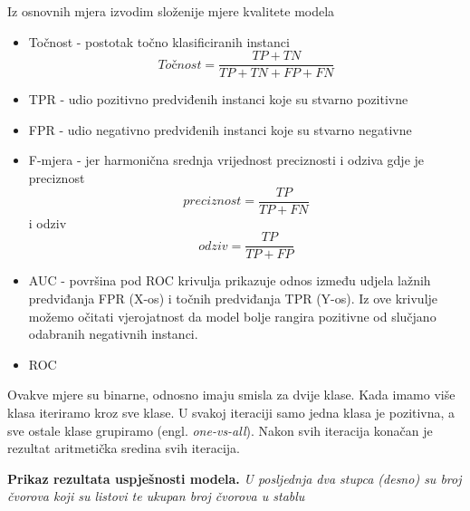 Iz osnovnih mjera izvodim složenije mjere kvalitete modela
\begin{itemize}
   \item Točnost - postotak točno klasificiranih instanci 
   \begin{equation}
   Točnost = \frac{TP+TN}{TP+TN+FP+FN}
   \end{equation}
   \item TPR - udio pozitivno predviđenih instanci koje su stvarno pozitivne
   \item FPR - udio negativno predviđenih instanci koje su stvarno negativne
   \item F-mjera - jer harmonična srednja vrijednost preciznosti i odziva gdje je preciznost
   \begin{equation}
    preciznost = \frac{TP}{TP+FN}
   \end{equation}
   i odziv
   \begin{equation}
    odziv = \frac{TP}{TP+FP}
   \end{equation}
   \item AUC - površina pod ROC krivulja prikazuje odnos između udjela lažnih predviđanja FPR (X-os) i točnih predviđanja TPR (Y-os). Iz ove krivulje možemo očitati vjerojatnost da model bolje rangira pozitivne od slučjano odabranih negativnih instanci.
   \item ROC
\end{itemize}

Ovakve mjere su binarne, odnosno imaju smisla za dvije klase. Kada imamo više klasa iteriramo kroz sve klase. U svakoj iteraciji samo jedna klasa je pozitivna, a sve ostale klase grupiramo (engl. \textit{one-vs-all}). Nakon svih iteracija konačan je rezultat aritmetička sredina svih iteracija.

\begin{table}[!ht]
    \centering
    \caption[Prikaz rezultata uspješnosti modela]{\textbf{Prikaz rezultata uspješnosti modela.} \textit{U posljednja dva stupca (desno) su broj čvorova koji su listovi te ukupan broj čvorova u stablu}}
    \label{tab:mjera}
\end{table}

